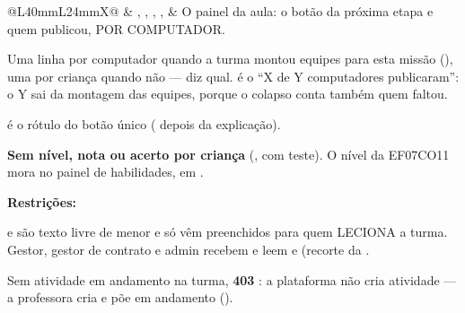 \begin{tabularx}{\linewidth}{@{}L{40mm}L{24mm}X@{}}
 & , , , ,  & O painel da aula: o botão da próxima etapa e quem publicou, POR COMPUTADOR.\par Uma linha por computador quando a turma montou equipes para esta missão (), uma por criança quando não ---  diz qual.  é o \enquote{X de Y computadores publicaram}: o Y sai da montagem das equipes, porque o colapso conta também quem faltou.\par {} é o rótulo do botão único ( depois da explicação).\par \textbf{Sem nível, nota ou acerto por criança} (, com teste). O nível da EF07CO11 mora no painel de habilidades, em .\par \textbf{Restrições:}\par \hspace*{1em}\textbullet{}  e  são texto livre de menor e só vêm preenchidos para quem LECIONA a turma. Gestor, gestor de contrato e admin recebem  e leem  e  (recorte da .\par \hspace*{1em}\textbullet{} Sem atividade em andamento na turma, \textbf{403} : a plataforma não cria atividade --- a professora cria e põe em andamento ().\\

\end{tabularx}
